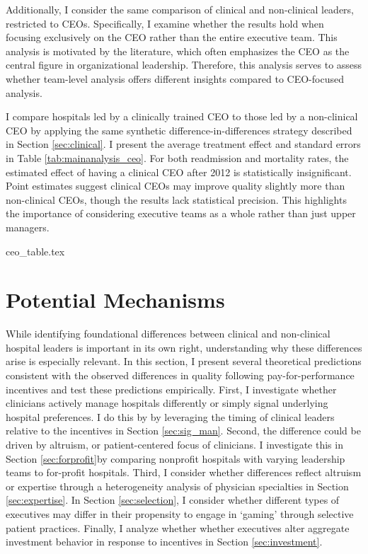 \documentclass[12pt]{article}
\begin{document}
        Additionally, I consider the same comparison of clinical and non-clinical leaders, restricted to CEOs. Specifically, I examine whether the results hold when focusing exclusively on the CEO rather than the entire executive team. This analysis is motivated by the literature, which often emphasizes the CEO as the central figure in organizational leadership. Therefore, this analysis serves to assess whether team-level analysis offers different insights compared to CEO-focused analysis.
        
        I compare hospitals led by a clinically trained CEO to those led by a non-clinical CEO by applying the same synthetic difference-in-differences strategy described in Section \ref{sec:clinical}. I present the average treatment effect and standard errors in Table \ref{tab:mainanalysis_ceo}. For both readmission and mortality rates, the estimated effect of having a clinical CEO after 2012 is statistically insignificant. Point estimates suggest clinical CEOs may improve quality slightly more than non-clinical CEOs, though the results lack statistical precision. This highlights the importance of considering executive teams as a whole rather than just upper managers. 

   {ceo_table.tex}


    \section{Potential Mechanisms}

    While identifying foundational differences between clinical and non-clinical hospital leaders is important in its own right, understanding why these differences arise is especially relevant. In this section, I present several theoretical predictions consistent with the observed differences in quality following pay-for-performance incentives and test these predictions empirically. First, I investigate whether clinicians actively manage hospitals differently or simply signal underlying hospital preferences. I do this by by leveraging the timing of clinical leaders relative to the incentives in Section \ref{sec:sig_man}. Second, the difference could be driven by altruism, or patient-centered focus of clinicians. I investigate this in Section \ref{sec:forprofit}by comparing nonprofit hospitals with varying leadership teams to for-profit hospitals. Third, I consider whether differences reflect altruism or expertise through a heterogeneity analysis of physician specialties in Section \ref{sec:expertise}. In Section \ref{sec:selection}, I consider whether different types of executives may differ in their propensity to engage in ‘gaming’ through selective patient practices. Finally, I analyze whether whether executives alter aggregate investment behavior in response to incentives in Section \ref{sec:investment}.
\end{document}
